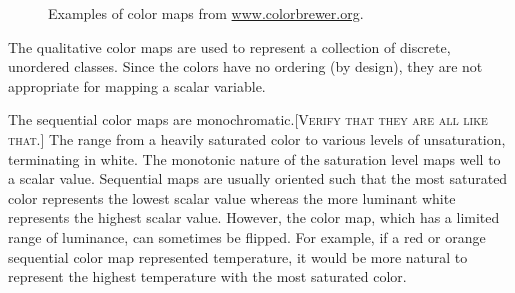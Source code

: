 \documentclass[twocolumn]{article}
\newcommand{\sticky}[1]{\textsc{[#1]}}
\begin{document}
\begin{figure}
  \centering
  \quad
  \quad
  \caption{Examples of color maps from
    \href{http://www.colorbrewer.org}{www.colorbrewer.org}.}
  \label{fig:BrewerExamples}
\end{figure}

The qualitative color maps are used to represent a collection of discrete,
unordered classes.  Since the colors have no ordering (by design), they are
not appropriate for mapping a scalar variable.

The sequential color maps are monochromatic.\sticky{Verify that they are all
  like that.}  The range from a heavily saturated color to various levels
of unsaturation, terminating in white.  The monotonic nature of the
saturation level maps well to a scalar value.  Sequential maps are usually
oriented such that the most saturated color represents the lowest scalar
value whereas the more luminant white represents the highest scalar value.
However, the color map, which has a limited range of luminance, can
sometimes be flipped.  For example, if a red or orange sequential color map
represented temperature, it would be more natural to represent the highest
temperature with the most saturated color.
\end{document}

